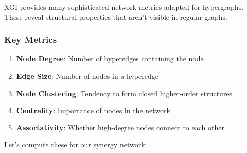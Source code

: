 \documentclass[
  11pt,
  letterpaper,
  oneside,
  openany]{book}
\providecommand{\tightlist}{%
  \setlength{\itemsep}{0pt}\setlength{\parskip}{0pt}}
\begin{document}
XGI provides many sophisticated network metrics adapted for hypergraphs.
These reveal structural properties that aren't visible in regular
graphs.

\subsubsection{Key Metrics}\label{key-metrics}

\begin{enumerate}
\def\labelenumi{\arabic{enumi}.}
\tightlist
\item
  \textbf{Node Degree}: Number of hyperedges containing the node
\item
  \textbf{Edge Size}: Number of nodes in a hyperedge
\item
  \textbf{Node Clustering}: Tendency to form closed higher-order
  structures
\item
  \textbf{Centrality}: Importance of nodes in the network
\item
  \textbf{Assortativity}: Whether high-degree nodes connect to each
  other
\end{enumerate}

Let's compute these for our synergy network:
\end{document}
